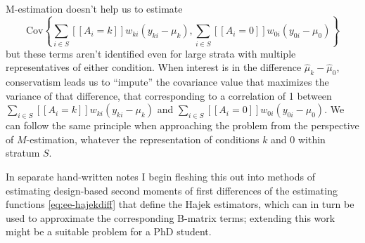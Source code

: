 M-estimation doesn't help us to estimate 
\[
\mathrm{Cov}\left\{
\sum_{i\in S} [\![A_i=k]\!] w_{ki} (y_{ki} - \mu_k), 
\sum_{i\in S} [\![A_i=0]\!] w_{0i} (y_{0i} - \mu_0) 
\right\}
\]
but these terms aren't identified even for large strata with multiple
representatives of either condition. When interest is in the
difference $\hat{\mu}_k - \hat{\mu}_0$, conservatism leads us to
``impute'' the covariance value that maximizes the variance of that difference, that
corresponding to a correlation of 1 between $\sum_{i\in S} [\![A_i=k]\!] w_{ki}
(y_{ki} - \mu_k)$ and $\sum_{i\in S} [\![A_i=0]\!] w_{0i} (y_{0i} -
\mu_0)$. We can follow the same principle when approaching the problem
from the perspective of $M$-estimation, whatever the representation of
conditions $k$ and 0 within stratum $S$.

In separate hand-written
notes I begin fleshing this out into methods of estimating design-based second
moments of first differences of the estimating functions
\eqref{eq:ee-hajekdiff} that define the Hajek estimators, which
can in turn be used to approximate the corresponding B-matrix terms;
extending this work might be a suitable problem for a PhD student. 

